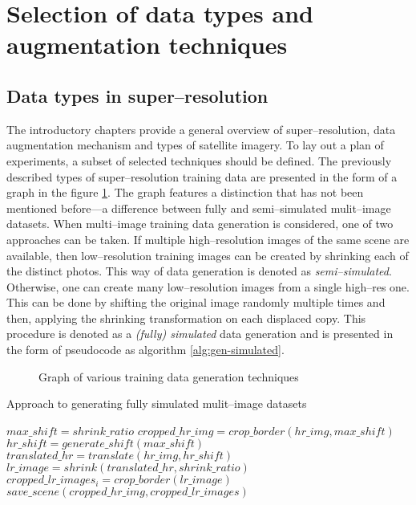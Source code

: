 \section{Selection of data types and augmentation techniques}
\subsection{Data types in super--resolution}
The introductory chapters provide a general overview of super--resolution, data augmentation mechanism and types of satellite imagery.
To lay out a plan of experiments, a subset of selected techniques should be defined.
The previously described types of super--resolution training data are presented in the form of a graph in the figure \ref{fig:image-types}.
The graph features a distinction that has not been mentioned before---a difference between fully and semi--simulated mulit--image datasets.
When multi--image training data generation is considered, one of two approaches can be taken.
If multiple high--resolution images of the same scene are available, then low--resolution training images can be created by shrinking each of the distinct photos.
This way of data generation is denoted as \textit{semi--simulated}.
Otherwise, one can create many low--resolution images from a single high--res one.
This can be done by shifting the original image randomly multiple times and then, applying the shrinking transformation on each displaced copy.
This procedure is denoted as a \textit{(fully) simulated} data generation and is presented in the form of pseudocode as algorithm \ref{alg:gen-simulated}.
\begin{figure}
	\centering
    
    \caption{Graph of various training data generation techniques}
    \label{fig:image-types}
\end{figure}
\begin{algorithm}
\caption{Approach to generating fully simulated mulit--image datasets}
\label{alg:gen-simulated}
\begin{algorithmic}
	\STATE $ max\_shift = shrink\_ratio $
		\STATE $ cropped\_hr\_img = crop\_border(hr\_img, max\_shift) $
			\STATE $ hr\_shift = generate\_shift(max\_shift) $
			\STATE $ translated\_hr = translate(hr\_img, hr\_shift) $
			\STATE $ lr\_image = shrink(translated\_hr, shrink\_ratio) $
			\STATE $ cropped\_lr\_images_{i} = crop\_border(lr\_image) $
		\ENDFOR
		\STATE $ save\_scene(cropped\_hr\_img, cropped\_lr\_images) $
	\ENDFOR
\end{algorithmic}
\end{algorithm}


